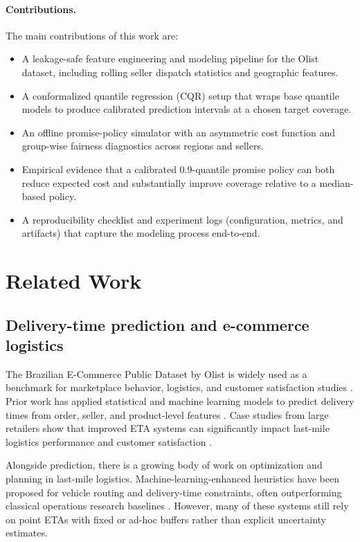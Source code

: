 \documentclass[10pt,twocolumn]{article}
\begin{document}
\paragraph{Contributions.}
The main contributions of this work are:
\begin{itemize}
  \item A leakage-safe feature engineering and modeling pipeline for the Olist dataset, including rolling seller dispatch statistics and geographic features.
  \item A conformalized quantile regression (CQR) setup that wraps base quantile models to produce calibrated prediction intervals at a chosen target coverage.
  \item An offline promise-policy simulator with an asymmetric cost function and group-wise fairness diagnostics across regions and sellers.
  \item Empirical evidence that a calibrated 0.9-quantile promise policy can both reduce expected cost and substantially improve coverage relative to a median-based policy.
  \item A reproducibility checklist and experiment logs (configuration, metrics, and artifacts) that capture the modeling process end-to-end.
\end{itemize}

\section{Related Work}
\subsection{Delivery-time prediction and e-commerce logistics}
The Brazilian E-Commerce Public Dataset by Olist is widely used as a benchmark for marketplace behavior, logistics, and customer satisfaction studies \citep{olistdataset}. Prior work has applied statistical and machine learning models to predict delivery times from order, seller, and product-level features \citep{brunilogistics2023,rokoss2024deliverytime}. Case studies from large retailers show that improved ETA systems can significantly impact last-mile logistics performance and customer satisfaction \citep{walmart2019cdt,kardinal2025lastmile}.

Alongside prediction, there is a growing body of work on optimization and planning in last-mile logistics. Machine-learning-enhanced heuristics have been proposed for vehicle routing and delivery-time constraints, often outperforming classical operations research baselines \citep{brunilogistics2023}. However, many of these systems still rely on point ETAs with fixed or ad-hoc buffers rather than explicit uncertainty estimates.
\end{document}
